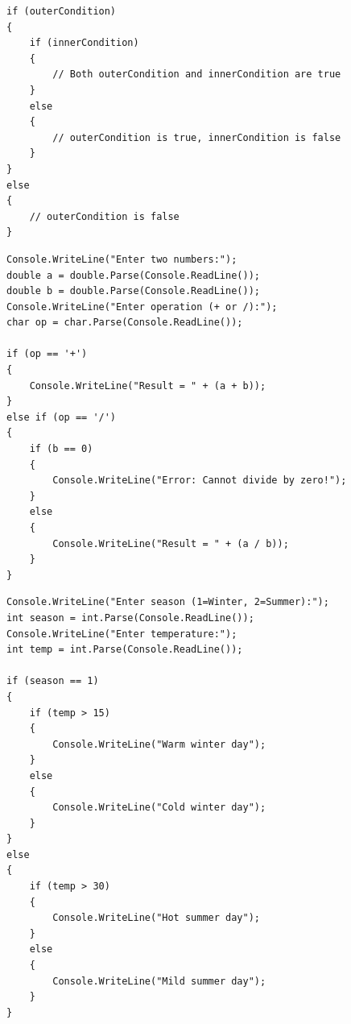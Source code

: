 \documentclass[14pt]{extarticle}
\begin{document}
\begin{boxCode}
\begin{english}
\begin{verbatim}
if (outerCondition)
{
    if (innerCondition)
    {
        // Both outerCondition and innerCondition are true
    }
    else
    {
        // outerCondition is true, innerCondition is false
    }
}
else
{
    // outerCondition is false
}
\end{verbatim}
\end{english}
\end{boxCode}

\begin{boxExample}
\begin{english}
\begin{verbatim}
Console.WriteLine("Enter two numbers:");
double a = double.Parse(Console.ReadLine());
double b = double.Parse(Console.ReadLine());
Console.WriteLine("Enter operation (+ or /):");
char op = char.Parse(Console.ReadLine());

if (op == '+')
{
    Console.WriteLine("Result = " + (a + b));
}
else if (op == '/')
{
    if (b == 0)
    {
        Console.WriteLine("Error: Cannot divide by zero!");
    }
    else
    {
        Console.WriteLine("Result = " + (a / b));
    }
}
\end{verbatim}
\end{english}
\end{boxExample}

\clearpage

\begin{boxExample}
\begin{english}
\begin{verbatim}
Console.WriteLine("Enter season (1=Winter, 2=Summer):");
int season = int.Parse(Console.ReadLine());
Console.WriteLine("Enter temperature:");
int temp = int.Parse(Console.ReadLine());

if (season == 1)
{
    if (temp > 15)
    {
        Console.WriteLine("Warm winter day");
    }
    else
    {
        Console.WriteLine("Cold winter day");
    }
}
else
{
    if (temp > 30)
    {
        Console.WriteLine("Hot summer day");
    }
    else
    {
        Console.WriteLine("Mild summer day");
    }
}
\end{verbatim}
\end{english}
\end{boxExample}

\clearpage
\end{document}
